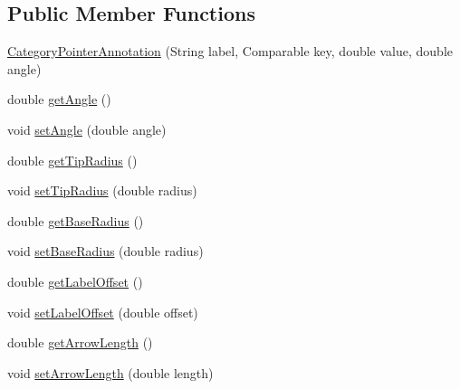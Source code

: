 \subsection*{Public Member Functions}
\begin{DoxyCompactItemize}
\item 
\mbox{\hyperlink{classorg_1_1jfree_1_1chart_1_1annotations_1_1_category_pointer_annotation_a485d95977f5d26d08236d1d28a0773ac}{Category\+Pointer\+Annotation}} (String label, Comparable key, double value, double angle)
\item 
double \mbox{\hyperlink{classorg_1_1jfree_1_1chart_1_1annotations_1_1_category_pointer_annotation_aae2b4be3620559b12dd7f304a5eb7982}{get\+Angle}} ()
\item 
void \mbox{\hyperlink{classorg_1_1jfree_1_1chart_1_1annotations_1_1_category_pointer_annotation_abfe5c275b7801cfb101c72f624f05a18}{set\+Angle}} (double angle)
\item 
double \mbox{\hyperlink{classorg_1_1jfree_1_1chart_1_1annotations_1_1_category_pointer_annotation_a6cb8c5eac8188dee2635a93069dee373}{get\+Tip\+Radius}} ()
\item 
void \mbox{\hyperlink{classorg_1_1jfree_1_1chart_1_1annotations_1_1_category_pointer_annotation_af59eb6536b65466595853197e7e0c29d}{set\+Tip\+Radius}} (double radius)
\item 
double \mbox{\hyperlink{classorg_1_1jfree_1_1chart_1_1annotations_1_1_category_pointer_annotation_a5e053ef26450a0e636562e187c0f0f1e}{get\+Base\+Radius}} ()
\item 
void \mbox{\hyperlink{classorg_1_1jfree_1_1chart_1_1annotations_1_1_category_pointer_annotation_ac28199dd33de04d60fd96c8e9e5a3773}{set\+Base\+Radius}} (double radius)
\item 
double \mbox{\hyperlink{classorg_1_1jfree_1_1chart_1_1annotations_1_1_category_pointer_annotation_afd01fc3fde080f86d3491cb491d84cad}{get\+Label\+Offset}} ()
\item 
void \mbox{\hyperlink{classorg_1_1jfree_1_1chart_1_1annotations_1_1_category_pointer_annotation_ae3941b11e27c687715635e67d364db88}{set\+Label\+Offset}} (double offset)
\item 
double \mbox{\hyperlink{classorg_1_1jfree_1_1chart_1_1annotations_1_1_category_pointer_annotation_a6e00ae383d6da634eee3cfacdd18b9b2}{get\+Arrow\+Length}} ()
\item 
void \mbox{\hyperlink{classorg_1_1jfree_1_1chart_1_1annotations_1_1_category_pointer_annotation_aa383879f46b82b5262726e8af9d35c9b}{set\+Arrow\+Length}} (double length)

\end{DoxyCompactItemize}
